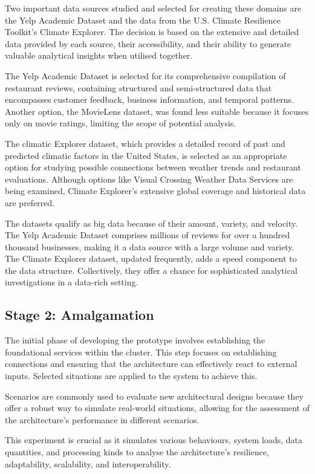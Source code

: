 \documentclass[journal]{IEEEtran}
\begin{document}
Two important data sources studied and selected for creating these domains are the Yelp Academic Dataset and the data from the U.S. Climate Resilience Toolkit's Climate Explorer. The decision is based on the extensive and detailed data provided by each source, their accessibility, and their ability to generate valuable analytical insights when utilised together.

The Yelp Academic Dataset is selected for its comprehensive compilation of restaurant reviews, containing structured and semi-structured data that encompasses customer feedback, business information, and temporal patterns. Another option, the MovieLens dataset, was found less suitable because it focuses only on movie ratings, limiting the scope of potential analysis.

The climatic Explorer dataset, which provides a detailed record of past and predicted climatic factors in the United States, is selected as an appropriate option for studying possible connections between weather trends and restaurant evaluations. Although options like Visual Crossing Weather Data Services are being examined, Climate Explorer's extensive global coverage and historical data are preferred.

The datasets qualify as big data because of their amount, variety, and velocity. The Yelp Academic Dataset comprises millions of reviews for over a hundred thousand businesses, making it a data source with a large volume and variety. The Climate Explorer dataset, updated frequently, adds a speed component to the data structure. Collectively, they offer a chance for sophisticated analytical investigations in a data-rich setting.

\subsection{Stage 2: Amalgamation}

The initial phase of developing the prototype involves establishing the foundational services within the cluster. This step focuses on establishing connections and ensuring that the architecture can effectively react to external inputs. Selected situations are applied to the system to achieve this. 

Scenarios are commonly used to evaluate new architectural designs because they offer a robust way to simulate real-world situations, allowing for the assessment of the architecture's performance in different scenarios. 

This experiment is crucial as it simulates various behaviours, system loads, data quantities, and processing kinds to analyse the architecture's resilience, adaptability, scalability, and interoperability. 
\end{document}
